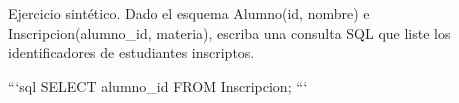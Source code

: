 Ejercicio sintético. Dado el esquema Alumno(id, nombre) e Inscripcion(alumno_id, materia), escriba una consulta SQL que liste los identificadores de estudiantes inscriptos.

```sql
SELECT alumno_id
FROM Inscripcion;
```
